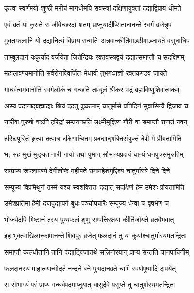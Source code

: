 \twolineshloka
{कृत्वा स्वर्णमयों शुण्ठी मरीचं मागधीमपि}
{सवस्त्रां दक्षिणायुक्तां दद्याद्विप्राय धीमते} %

\twolineshloka
{एवं व्रतं यः कुरुते स जीवेच्छरदां शतम्}
{प्राप्नुयादीप्सितानानन्ते स्वर्गं व्रजेन्नृप} %

\twolineshloka
{मुक्ताफलानि यो दद्यानित्यं विप्राय सन्मतिः}
{अन्नवान्कीर्तिमाञ्छीमाञ्जायते वसुधाधिप} %

\twolineshloka
{ताम्बूलदानं यःकुर्याद् वर्जयेता जितेन्द्रियः}
{रक्तवस्त्रद्वयं दद्यात्समाप्तौ च सदक्षिणम्} %

\twolineshloka
{महालावण्यमानोति सर्वरोगविवर्जितः}
{मेधावी तुभगःप्राज्ञो रक्तकण्डव जायते} %

\twolineshloka
{गाधर्वत्वमवानोति स्वर्गलोकं च गच्छति}
{ताम्बूलं श्रीकर भद्रं ब्रह्मविष्णुशिवात्मकम्} %

\twolineshloka
{अस्य प्रदानाद्ब्रह्माद्याः श्रियं ददतु पुष्कलाम्}
{चातुर्मासे प्रतिदिनं सुवासिन्यै द्विजाय च} %

\twolineshloka
{नारीवा पुरुषो वाऽपि हरिद्रां सम्प्रयच्छति}
{लक्ष्मीमुद्दिश्य गौरी वा समाप्तौ राजतं नवन्} %

\twolineshloka
{हरिद्रापूरितं कृत्वा तत्पात्र दक्षिणान्वितम्}
{प्रदद्याद्भक्तिसंयुक्तं देवी मे प्रीयतामिति} %

\twolineshloka
{भ; सह मुखं मुङ्क्त नारी नार्या तथा पुमान्}
{सौभाग्यप्रक्षयं धान्यं धनपुत्रसमुन्नतिम्} %

\twolineshloka
{सम्प्राप्य रूपलावण्ये देवीलोके महीयते}
{उमामहेशमुद्दिश्य चातुर्मास्ये दिने दिने} %

\twolineshloka
{सम्पूज्य विप्रमिथुनं तस्मै यश्च स्वशक्तितः}
{दद्यात् सदक्षिणं हेम उमेशः प्रीयतामिति} %

\twolineshloka
{उमेशप्रतिमा हैमी दयादुद्यापने बुधः}
{पञ्चोपचारैः सम्पूज्य धेन्वा च वृषभेण च} %

\twolineshloka
{भोजयेदपि मिष्टानं तस्य पुण्यफलं शृणु}
{सम्पत्तिरक्षया कीर्तिर्जायते व्रतवैभवात्} %

\twolineshloka
{इह भुक्त्वाखिलान्कामानन्ते शिवपुरं व्रजेत्}
{फलदानं तु यः कुर्याश्चातुर्मास्यमतन्द्रितः} %

\twolineshloka
{समाप्तौ कलधौतानि तानि दद्याट्विजातथे}
{सन्निनोरयान् प्राप्य सन्तति चानपायिनीम्} %

\twolineshloka
{फलदानस्य माहात्म्यान्मोदते नन्दने बने}
{पुष्पदानव्रते चापि स्वर्णपुष्पादि दापयेत्} %

\twolineshloka
{स सौभाग्यं परं प्राप्य गन्धर्वपदमाप्नुयात्}
{वासुदेवे प्रसुप्ते तु चातुर्मास्यमतन्द्रितः} %


